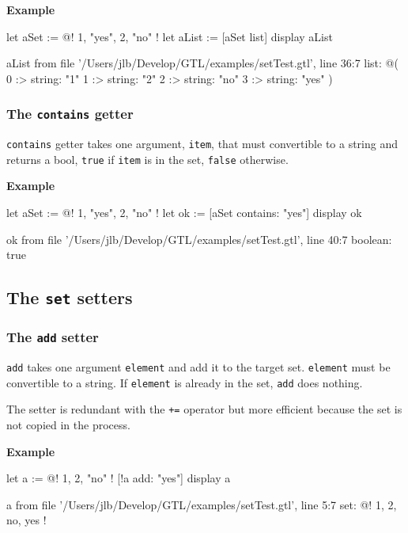 \documentclass[10pt,openright,twosides,final]{memoir}
\newcommand{\gtlinline}[1]{\colorbox{light-blue}{\lstinline[language=gtl]{#1}}}
\newcommand{\example}{\vspace{.75em}\noindent\textbf{Example}\vspace{0em}}
\begin{document}
\example
\begin{gtl}
let aSet := @! 1, "yes", 2, "no" !
let aList := [aSet list]
display aList
\end{gtl}
\begin{console}
aList from file '/Users/jlb/Develop/GTL/examples/setTest.gtl', line 36:7
    list: @(
        0 :>
            string: "1"
        1 :>
            string: "2"
        2 :>
            string: "no"
        3 :>
            string: "yes"
    )
\end{console}

\subsubsection{The \texttt{contains} getter}

\gtlinline{contains} getter takes one argument, \gtlinline{item}, that must convertible to a string and returns a bool, \gtlinline{true} if \gtlinline{item} is in the set, \gtlinline{false} otherwise.

\example
\begin{gtl}
let aSet := @! 1, "yes", 2, "no" !
let ok := [aSet contains: "yes"]
display ok
\end{gtl}
\begin{console}
ok from file '/Users/jlb/Develop/GTL/examples/setTest.gtl', line 40:7
    boolean: true
\end{console}

\subsection{The \texttt{set} setters}

\subsubsection{The \texttt{add} setter}

\gtlinline{add} takes one argument \gtlinline{element} and add it to the target set. \gtlinline{element} must be convertible to a string. If \gtlinline{element} is already in the set, \gtlinline{add} does nothing.

The setter is redundant with the \gtlinline{+=} operator but more efficient because the set is not copied in the process.

\example
\begin{gtl}
let a := @! 1, 2, "no" !
[!a add: "yes"]
display a
\end{gtl}
\begin{console}
a from file '/Users/jlb/Develop/GTL/examples/setTest.gtl', line 5:7
    set: @!
        1, 2, no, yes
    !
\end{console}
\end{document}
